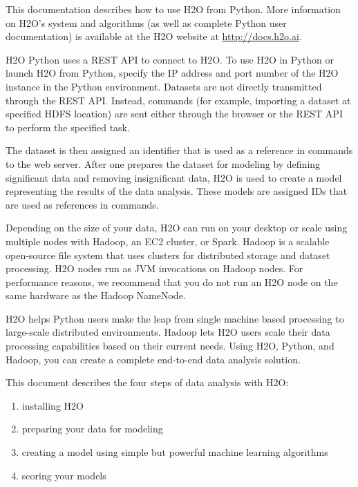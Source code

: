 This documentation describes how to use H2O from Python. More information on H2O's system and algorithms
(as well as complete Python user documentation) is available at the H2O website at {\url{http://docs.h2o.ai}}.

H2O Python uses a REST API to connect to H2O. To use H2O in Python or launch H2O from Python, specify the IP address and port number of the H2O instance in the Python environment. Datasets are not directly transmitted
through the REST API. Instead, commands (for example, importing a dataset at specified HDFS location) are sent either through the browser or the REST API to perform the specified task.

The dataset is then assigned an identifier that is used as a reference in  commands to the web server.
After one prepares the dataset for modeling by defining significant data and removing insignificant data,
H2O is used to create a model representing the results of the data analysis.
These models are assigned IDs that are used as references in commands.

Depending on the size of your data,  H2O can run on your desktop or scale using multiple nodes with Hadoop,
an EC2 cluster, or Spark.  Hadoop is a scalable open-source file
system that uses clusters for distributed storage and dataset processing. H2O nodes run as JVM invocations on Hadoop
nodes. For performance reasons, we recommend that you do not run an H2O node on the same hardware as the Hadoop
NameNode.

H2O helps Python users make the leap from single machine based processing to large-scale distributed environments.
Hadoop lets H2O users scale their data processing capabilities based on their current needs.
Using H2O, Python, and Hadoop, you can create a complete end-to-end data analysis solution.

This document describes the four steps of data analysis with H2O:
\begin{enumerate}

\item installing H2O
\item preparing your data for modeling
\item creating a model using simple but powerful machine learning algorithms
\item scoring your models

\end{enumerate}

\newpage


